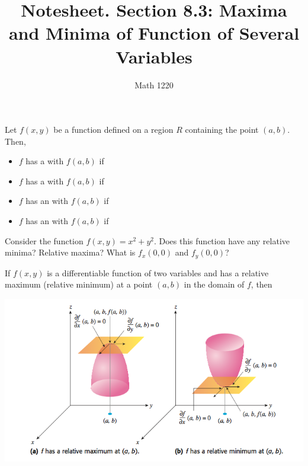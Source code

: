 \documentclass[12pt, a4paper]{article}
\author{Math 1220}
\title{Notesheet. Section 8.3: Maxima and Minima of Function of
  Several Variables}
\date{}
\begin{document}
\maketitle
\nameline
\vspace{0.5in}
\begin{defi}
  Let \(f(x,y)\) be a function defined on a region \(R\) containing
  the point \((a,b)\). Then,
  \begin{itemize}
  \item \(f\) has a  with
     \(f(a,b)\) if \\
    
  \item \(f\) has a  with
     \(f(a,b)\) if\\
    
  \item \(f\) has an  with
     \(f(a,b)\) if\\
    
  \item \(f\) has an  with
     \(f(a,b)\) if
  \end{itemize}
\end{defi}
\begin{ex}
  Consider the function \(f(x,y) = x^2 + y^2\). Does this function
  have any relative minima? Relative maxima? What is
  \(f_x(0,0)\) and \(f_y(0,0)\)?
\end{ex}
\begin{thrm}
  If \(f(x,y)\) is a differentiable function of two variables and has
  a relative maximum (relative minimum) at a point \((a,b)\) in the
  domain of \(f\), then 
\end{thrm}
\includegraphics[scale=0.5]{images/local-min-max}
\end{document}
